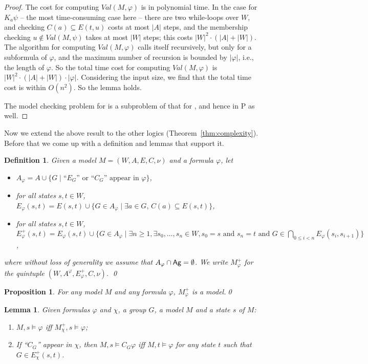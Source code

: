\documentclass{article}
\newtheorem{definition}[theorem]{Definition}%
\newtheorem{lemma}[theorem]{Lemma}%
\newtheorem{proposition}[theorem]{Proposition}%
\newcommand{\ab}{\ensuremath{A}\xspace}
\newcommand{\ag}{\text{\normalfont\textsf{Ag}}\xspace}
\renewcommand{\phi}{\varphi}
\renewcommand{\l}{\text{\normalfont EL}\xspace}
\newcommand{\ls}{\text{\normalfont EL$^s$}\xspace}
\begin{document}
\begin{proof}
The cost for computing $Val(M,\phi)$ is in polynomial time. In the case for $K_a \psi$ -- the most time-consuming case here -- there are two while-loops over $W$, and checking $C(a) \subseteq E(t,u)$ costs at most $|A|$ steps, and the membership checking $u \notin Val(M,\psi)$ takes at most $|W|$ steps; this costs $|W|^2 \cdot (|A| + |W|)$. The algorithm for computing $Val(M,\phi)$ calls itself recursively, but only for a subformula of $\phi$, and the maximum number of recursion is bounded by $|\phi|$, i.e., the length of $\phi$. So the total time cost for computing $Val(M,\phi)$ is $|W|^2 \cdot (|A| + |W|) \cdot |\phi|$. Considering the input size, we find that the total time cost is within $O(n^2)$. So the lemma holds.

The model checking problem for \ls is a subproblem of that for \l, and hence in P as well.
\end{proof}

Now we extend the above result to the other logics (Theorem~\ref{thm:complexity}). Before that we come up with a definition and lemmas that support it.

\begin{definition}\label{def:trans-e}
Given a model $M = (W,\ab,E,C,\nu)$ and a formula $\phi$, let
\begin{itemize}
\item $\ab_\phi=\ab\cup\{G \mid\text{``$E_G$'' or ``$C_G$'' appear in $\phi$}\}$,
\item for all states $s,t\in W$, $E_\phi(s,t)=E(s,t)\cup\{G\in A_\phi\mid\text{$\exists a\in G$, $C(a)\subseteq E(s,t)$}\}$,
\item for all states $s,t\in W$, $E_{\phi}^+(s,t) = E_\phi(s,t) \cup \{G\in A_\phi \mid \exists n \geq 1, \exists s_0,\dots,s_n\in W, s_0=s \text{ and } s_n=t \text{ and } G\in \bigcap_{0\leq i< n}E_\phi(s_i,s_{i+1})\}$,
\end{itemize}
where without loss of generality we assume that $A_\phi \cap \ag = \emptyset$. We write $M_\phi^+$ for the quintuple $(W,A^\phi,E^+_\phi,C,\nu)$.
\qed
\end{definition}

\begin{proposition}
For any model $M$ and any formula $\phi$, $M^+_\phi$ is a model.\qed
\end{proposition}

\begin{lemma}\label{lem:trans-e}
Given formulas $\phi$ and $\chi$, a group $G$, a model $M$ and a state $s$ of $M$:
\begin{enumerate}
\item\label{it:trans-e1} $M,s\models\phi$ iff $M^+_{\chi},s\models\phi$;
\item\label{it:trans-e3} If ``$C_G$'' appear in $\chi$, then $M,s\models C_G\phi$ iff $M,t\models \phi$ for any state $t$ such that $G\in E^+_{\chi}(s,t)$.
\end{enumerate} 
\end{lemma}
\end{document}
